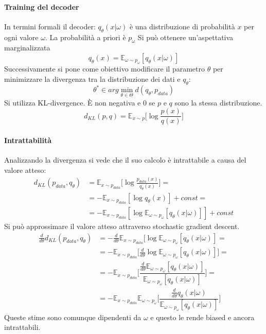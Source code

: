 \paragraph{Training del decoder}
In termini formali il decoder: $q_\theta(x|\omega)$ \`e una distribuzione di probabilit\`a $x$ per ogni valore $\omega$.
La probabilit\`a a priori \`e $p_\omega$
Si pu\`o ottenere un'aspettativa marginalizzata
$$q_\theta(x) = \mathbb{E}_{\omega\sim p_\omega}[q_\theta(x|\omega)]$$
Successivamente si pone come obiettivo modificare il parametro $\theta$ per minimizzare la divergenza tra la distribuzione dei dati e $q_\theta$:
$$\theta^*\in arg\min\limits_{\theta\in\Theta}d(q_\theta,p_{data})$$
Si utilizza KL-divergence.
\`E non negativa e $0$ se $p$ e $q$ sono la stessa distribuzione.
$$d_{KL}(p,q) = \mathbb{E}_{x\sim p}\bigl[\log\frac{p(x)}{q(x)}\bigr]$$

\paragraph{Intrattabilit\`a}
Analizzando la divergenza si vede che il suo calcolo \`e intrattabile a causa del valore atteso:
\begin{align*}
	d_{KL}(p_{data}, q_\theta) &= \mathbb{E}_{x\sim p_{data}}\bigl[\log\frac{p_{data}(x)}{q_\theta(x)}\bigr]=\\
	& = -\mathbb{E}_{x\sim p_{data}}[\log q_\theta(x)] + const=\\
	&= -\mathbb{E}_{x\sim p_{data}}[\log\mathbb{E}_{\omega\sim p_\omega} [q_\theta(x|\omega)]]+const
\end{align*}
Si pu\`o approssimare il valore atteso attraverso stochastic gradient descent.
\begin{align*}
	\frac{d}{d\theta}d_{KL}(p_{data},q_\theta) &= -\frac{d}{d\theta}\mathbb{E}_{x\sim p_{data}}[\log\mathbb{E}_{\omega\sim p_\omega}[q_\theta(x|\omega)]=\\
	& = -\mathbb{E}_{x\sim p_{data}}\bigl[\frac{d}{d\theta}\log\mathbb{E}_{\omega\sim p_\omega}[q_\theta(x|\omega)]\bigr]=\\
	& = - \mathbb{E}_{x\sim p_{data}}\biggl[\dfrac{\frac{d}{d\theta}\mathbb{E}_{\omega\sim p_\omega}[q_\theta(x|\omega)]}{\mathbb{E}_{\omega\sim p_\omega}[q_\theta(x|\omega)]}\biggr]=\\
	& = - \mathbb{E}_{x\sim p_{data}}\mathbb{E}_{\omega\sim p_\omega}\biggl[\dfrac{\frac{d}{d\theta}q_\theta(x|\omega)}{\mathbb{E}_{\omega\sim p_\omega}[q_\theta(x|\omega)]}\biggr]
\end{align*}
Queste stime sono comunque dipendenti da $\omega$ e questo le rende biased e ancora intrattabili.

